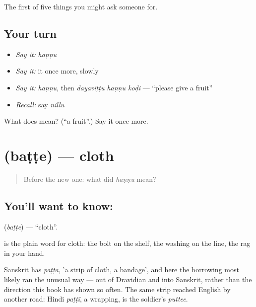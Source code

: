 \begin{grammarlens}[title={What you've built}]
The first of five things you might ask someone for.
\end{grammarlens}

\subsection*{Your turn}
\begin{itemize}
\raggedright
  \item \emph{Say it:} \emph{haṇṇu}
  \item \emph{Say it:} it once more, slowly
  \item \emph{Say it:} \emph{haṇṇu}, then \emph{dayaviṭṭu haṇṇu koḍi} — \textquotedblleft{}please give a fruit\textquotedblright{}
  \item \emph{Recall:} say \emph{nillu}
\end{itemize}

\begin{tcolorbox}[breakable,colback=teal!4,colframe=teal!35!black,title={Before you move on}]
What does  mean? (\textquotedblleft{}a fruit\textquotedblright{}.) Say it once more.
\end{tcolorbox}
\section[\texorpdfstring{\kn{ಬಟ್ಟೆ} (baṭṭe)}{ಬಟ್ಟೆ (baṭṭe)}]{ (baṭṭe) — cloth}

\label{lesson:KA-C46-cloth}



\begin{quote}
Before the new one: what did \emph{haṇṇu} mean?
\end{quote}

\subsection*{You'll want to know: }
\textbf{} (\emph{baṭṭe}) — \textquotedblleft{}cloth\textquotedblright{}.

 is the plain word for cloth: the bolt on the shelf, the washing on the line, the rag in your hand.

Sanskrit has \emph{paṭṭa}, 'a strip of cloth, a bandage', and here the borrowing most likely ran the unusual way — out of Dravidian and into Sanskrit, rather than the direction this book has shown so often. The same strip reached English by another road: Hindi \emph{paṭṭī}, a wrapping, is the soldier's \emph{puttee}.

